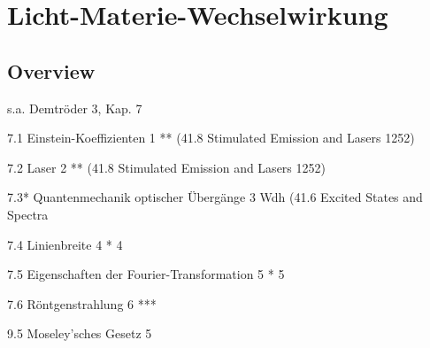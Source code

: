 \renewcommand{\lastmod}{10. September 2024}
\renewcommand{\chapterauthors}{Markus Lippitz}

\chapter{Licht-Materie-Wechselwirkung}






\section{Overview}

s.a. Demtröder 3, Kap. 7

 
7.1 Einstein-Koeffizienten 1	** (41.8 Stimulated Emission and Lasers 1252)


7.2 Laser 2	** (41.8 Stimulated Emission and Lasers 1252)

7.3* Quantenmechanik optischer Übergänge 3	Wdh (41.6 Excited States and Spectra

7.4 Linienbreite 4	*	4 

7.5 Eigenschaften der Fourier-Transformation 5	*	5 

7.6 Röntgenstrahlung 6	***	

9.5 Moseley’sches Gesetz 5	





\printbibliography[segment=\therefsegment,heading=subbibliography]
